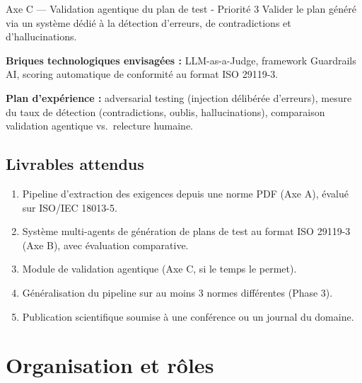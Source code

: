 \documentclass[12pt, a4paper]{article}
\begin{document}
\vspace{0.8em}

\begin{axebox}[axeC]{Axe C — Validation agentique du plan de test - Priorité 3}
Valider le plan généré via un système dédié à la détection d'erreurs, de contradictions
et d'hallucinations.

\medskip
\textbf{Briques technologiques envisagées :} LLM-as-a-Judge, framework Guardrails AI, scoring automatique de conformité au format ISO 29119-3.

\medskip
\textbf{Plan d'expérience :} adversarial testing (injection délibérée d'erreurs),
mesure du taux de détection (contradictions, oublis, hallucinations), comparaison
validation agentique vs.\ relecture humaine.
\end{axebox}

\subsection{Livrables attendus}

\begin{enumerate}
  \item Pipeline d'extraction des exigences depuis une norme PDF (Axe A), évalué sur
    ISO/IEC 18013-5.
  \item Système multi-agents de génération de plans de test au format ISO 29119-3 (Axe B),
    avec évaluation comparative.
  \item Module de validation agentique (Axe C, si le temps le permet).
  \item Généralisation du pipeline sur au moins 3 normes différentes (Phase 3).
  \item Publication scientifique soumise à une conférence ou un journal du domaine.
\end{enumerate}

\section{Organisation et rôles}
\end{document}
